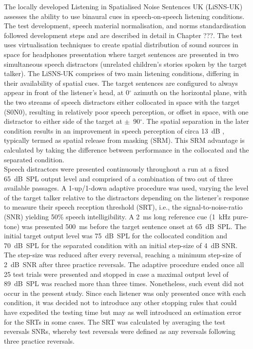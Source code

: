 \documentclass[a4paper, twoside]{templates/ociamthesis}
\begin{document}
\hfill\break
The locally developed Listening in Spatialised Noise Sentences UK (LiSNS-UK) assesses the ability to use binaural cues in speech-on-speech listening conditions. The test development, speech material normalisation, and norms standardisation followed \textcite{Cameron2007} development steps and are described in detail in Chapter ???. The test uses virtualisation techniques to create spatial distribution of sound sources in space for headphones presentation where target sentences \autocite[ASL;][]{MacLeod1990} are presented in two simultaneous speech distractors (unrelated children's stories spoken by the target talker). The LiSNS-UK comprises of two main listening conditions, differing in their availability of spatial cues. The target sentences are configured to always appear in front of the listener's head, at 0\(^{\circ}\) azimuth on the horizontal plane, with the two streams of speech distractors either collocated in space with the target (S0N0), resulting in relatively poor speech perception, or offset in space, with one distractor to either side of the target at \(\pm\)~90\(^{\circ}\). The spatial separation in the later condition results in an improvement in speech perception of circa 13~dB \autocite{Cameron2011}, typically termed as spatial release from masking (SRM). This SRM advantage is calculated by taking the difference between performance in the collocated and the separated condition.\\

Speech distractors were presented continuously throughout a run at a fixed 65~dB~SPL output level and comprised of a combination of two out of three available passages. A 1-up/1-down adaptive procedure was used, varying the level of the target talker relative to the distractors depending on the listener's response to measure their speech reception threshold (SRT), i.e., the signal-to-noise-ratio (SNR) yielding 50\% speech intelligibility. A 2~ms long reference cue (1~kHz pure-tone) was presented 500~ms before the target sentence onset at 65~dB~SPL. The initial target output level was 75~dB~SPL for the collocated condition and 70~dB~SPL for the separated condition with an initial step-size of 4~dB SNR. The step-size was reduced after every reversal, reaching a minimum step-size of 2~dB~SNR after three practice reversals. The adaptive procedure ended once all 25 test trials were presented and stopped in case a maximal output level of 89~dB~SPL was reached more than three times. Nonetheless, such event did not occur in the present study. Since each listener was only presented once with each condition, it was decided not to introduce any other stopping rules that could have expedited the testing time but may as well introduced an estimation error for the SRTs in some cases. The SRT was calculated by averaging the test reversals SNRs, whereby test reversals were defined as any reversals following three practice reversals.\\
\end{document}
